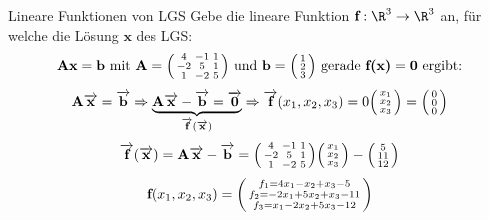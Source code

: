 \begin{example2}{Lineare Funktionen von LGS}
    Gebe die lineare Funktion $\textbf{f}: \R^3 \to \R^3$ an, für welche die Lösung $\textbf{x}$ des LGS:
    $$\textbf{Ax} = \textbf{b} \text{ mit } \textbf{A} = \begin{psmallmatrix} 4 & -1 & 1 \\ -2 & 5 & 1 \\ 1 & -2 & 5 \end{psmallmatrix} \text{ und } \textbf{b} = \begin{psmallmatrix} 1 \\ 2 \\ 3 \end{psmallmatrix} \text{ gerade } \textbf{f(x)} = \textbf{0} \text{ ergibt:}$$
    $$\textbf{A} \overrightarrow{\textbf{x}} = \overrightarrow{\textbf{b}} \Rightarrow \underbrace{\textbf{A} \overrightarrow{\textbf{x}} - \overrightarrow{\textbf{b}} = \overrightarrow{\textbf{0}}}_{\overrightarrow{\textbf{f}}(\overrightarrow{\textbf{x}})} \Rightarrow \overrightarrow{\textbf{f}}(x_1, x_2, x_3) = 0 \begin{psmallmatrix} x_1 \\ x_2 \\ x_3 \end{psmallmatrix} = \begin{psmallmatrix} 0 \\ 0 \\ 0 \end{psmallmatrix}$$
    \tcblower
    $$\overrightarrow{\textbf{f}}(\overrightarrow{\textbf{x}}) = \textbf{A} \overrightarrow{\textbf{x}} - \overrightarrow{\textbf{b}} = \begin{psmallmatrix} 4 & -1 & 1 \\ -2 & 5 & 1 \\ 1 & -2 & 5 \end{psmallmatrix} \begin{psmallmatrix} x_1 \\ x_2 \\ x_3 \end{psmallmatrix} - \begin{psmallmatrix} 5 \\ 11 \\ 12 \end{psmallmatrix}$$
    $$\textbf{f}(x_1, x_2, x_3) = \begin{psmallmatrix} f_1 = 4x_1 - x_2 + x_3 - 5 \\ f_2 = -2x_1 + 5x_2 + x_3 - 11 \\ f_3 = x_1 - 2x_2 + 5x_3 - 12 \end{psmallmatrix}$$
\end{example2}


